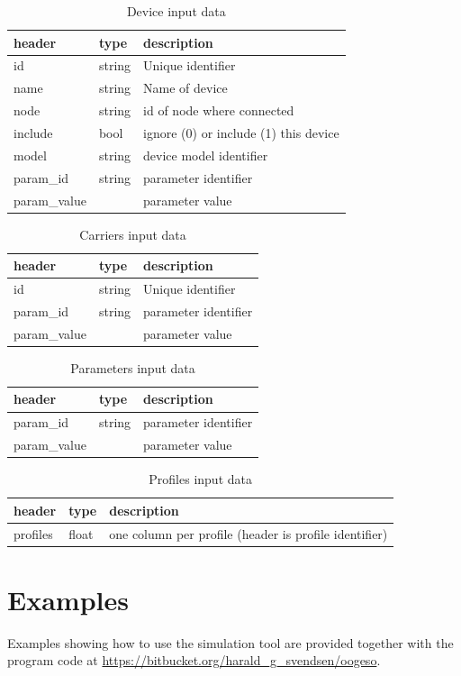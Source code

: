 \documentclass[12pt]{article}
\begin{document}
\begin{table}[h]
\caption{Device input data}
\begin{tabular}{lll}
	\hline
	header & type & description \\
	\hline
	id & string & Unique identifier \\
	name & string & Name of device \\
	node & string &  id of node where connected \\
	include & bool & ignore (0) or include (1) this device \\
	model & string & device model identifier \\
	param\_id & string & parameter identifier \\
	param\_value & & parameter value
\end{tabular}
\end{table}

\begin{table}[h]
\caption{Carriers input data}
\begin{tabular}{lll}
	\hline
	header & type & description \\
	\hline
	id & string & Unique identifier \\
	param\_id & string & parameter identifier \\
	param\_value & & parameter value
\end{tabular}
\end{table}

\begin{table}[h]
\caption{Parameters input data}
\begin{tabular}{lll}
	\hline
	header & type & description \\
	\hline
	param\_id & string & parameter identifier \\
	param\_value & & parameter value
\end{tabular}
\end{table}

\begin{table}[h]
\caption{Profiles input data}
\begin{tabular}{lll}
	\hline
	header & type & description \\
	\hline
	profiles & float & one column per profile (header is profile identifier)\\
\end{tabular}
\end{table}


\section{Examples}

Examples showing how to use the simulation tool are provided together with the program code at
\url{https://bitbucket.org/harald_g_svendsen/oogeso}.





\printbibliography
\end{document}
